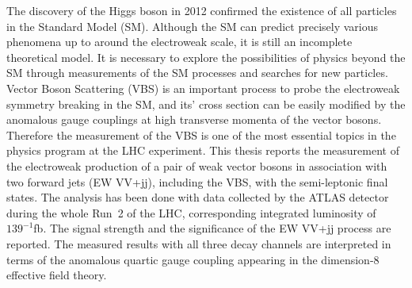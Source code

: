 The discovery of the Higgs boson in 2012 confirmed the existence of all particles in the Standard Model (SM). 
Although the SM can predict precisely various phenomena up to around the electroweak scale, it is still an incomplete theoretical model. 
It is necessary to explore the possibilities of physics beyond the SM through measurements of the SM processes and searches for new particles. 
Vector Boson Scattering (VBS) is an important process to probe the electroweak symmetry breaking in the SM, and its’ cross section can be easily modified by the anomalous gauge couplings at high transverse momenta of the vector bosons. Therefore the measurement of the VBS is one of the most essential topics in the physics program at the LHC experiment.
This thesis reports the measurement of the electroweak production of a pair of weak vector bosons in association with two forward jets (EW VV+jj), including the VBS, with the semi-leptonic final states.
The analysis has been done with data collected by the ATLAS detector during the whole Run~2 of the LHC, corresponding integrated luminosity of $139^{-1}$fb.
The signal strength and the significance of the EW VV+jj process are reported.
The measured results with all three decay channels are interpreted in terms of the anomalous quartic gauge coupling appearing in the dimension-8 effective field theory.

